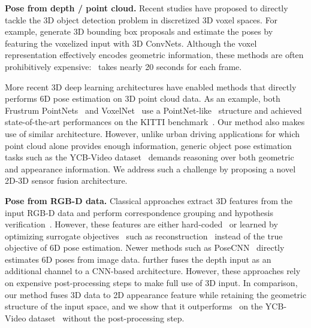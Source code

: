 \documentclass[10pt,twocolumn,letterpaper]{article}
\begin{document}
\vspace{1mm}
\noindent
\textbf{Pose from depth / point cloud.}
Recent studies have proposed to directly tackle the 3D object detection problem in discretized 3D voxel spaces. For example, \citet{song2014sliding,song2016deep} generate 3D bounding box proposals and estimate the poses by featuring the voxelized input with 3D ConvNets. Although the voxel representation effectively encodes geometric information, these methods are often prohibitively expensive:~\cite{song2016deep} takes nearly 20 seconds for each frame.

More recent 3D deep learning architectures have enabled methods that directly performs 6D pose estimation on 3D point cloud data. As an example, both Frustrum PointNets~\cite{qi2017frustum} and VoxelNet~\cite{zhou2017voxelnet} use a PointNet-like~\cite{qi2016pointnet} structure and achieved state-of-the-art performances on the KITTI benchmark~\cite{kitti}. Our method also makes use of similar architecture. However, unlike urban driving applications for which point cloud alone provides enough information, generic object pose estimation tasks such as the YCB-Video dataset~\cite{xiang2017posecnn} demands reasoning over both geometric and appearance information. We address such a challenge by proposing a novel 2D-3D sensor fusion architecture.

\vspace{1mm}
\noindent
\textbf{Pose from RGB-D data.} 
Classical approaches extract 3D features from the input RGB-D data and perform correspondence grouping and hypothesis verification~\cite{hinterstoisser2012model,Hinterstoier2011MultimodalTF,rios2013discriminatively,kehl2016deep,tejani2014latent,wohlhart2015learning,brachmann2014learning}. However, these features are either hard-coded~\cite{hinterstoisser2012model,Hinterstoier2011MultimodalTF,rios2013discriminatively} or learned by optimizing surrogate objectives~\cite{tejani2014latent,wohlhart2015learning,brachmann2014learning} such as reconstruction~\cite{kehl2016deep} instead of the true objective of 6D pose estimation. Newer methods such as PoseCNN~\cite{xiang2017posecnn} directly estimates 6D poses from image data.
\citet{li2018unified} further fuses the depth input as an additional channel to a CNN-based architecture. However, these approaches rely on expensive post-processing steps to make full use of 3D input. In comparison, our method fuses 3D data to 2D appearance feature while retaining the geometric structure of the input space, and we show that it outperforms~\cite{xiang2017posecnn} on the YCB-Video dataset~\cite{xiang2017posecnn} without the post-processing step. 
\end{document}
